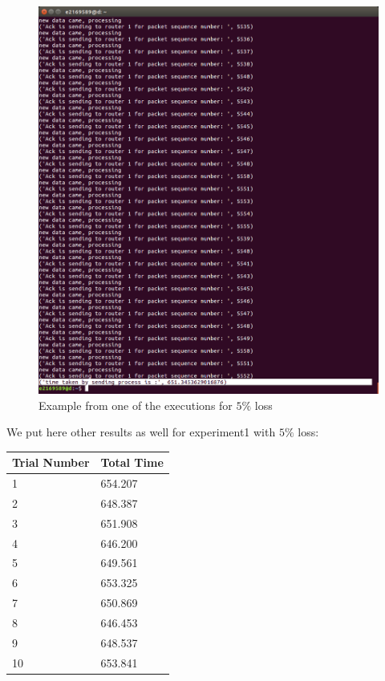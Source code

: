 \documentclass[conference]{IEEEtran}
\begin{document}
\begin{figure}[H]
    \centering
    \includegraphics[scale=0.13]{5loss.png}
    \caption{Example from one of the executions for $5\%$ loss}
\end{figure}

We put here other results as well for experiment1 with $5\%$ loss:

\begin{table}[H]
\begin{tabular}{|l|l|}
\hline
Trial Number & Total Time \\ \hline
1            & 654.207    \\ \hline
2            & 648.387    \\ \hline
3            & 651.908    \\ \hline
4            & 646.200    \\ \hline
5            & 649.561    \\ \hline
6            & 653.325    \\ \hline
7            & 650.869    \\ \hline
8            & 646.453    \\ \hline
9            & 648.537    \\ \hline
10           & 653.841    \\ \hline
\end{tabular}
\end{table}
\end{document}
